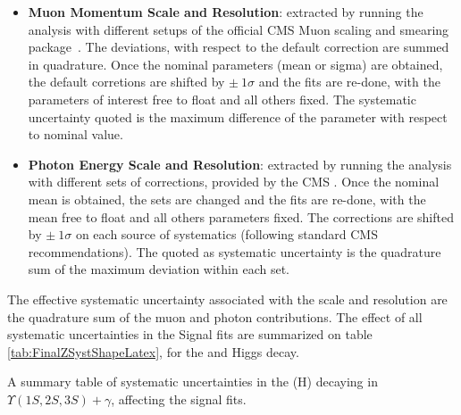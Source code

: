 \begin{itemize}

\item \textbf{Muon Momentum Scale and Resolution}: extracted by running the analysis with different setups of the official CMS Muon scaling and smearing package~. The deviations, with respect to the default correction are summed in quadrature. Once the nominal parameters (mean or sigma) are obtained, the default corretions are shifted by $\pm~1\sigma$ and the fits are re-done, with the parameters of interest free to float and all others fixed. The systematic uncertainty quoted is the maximum difference of the parameter with respect to nominal value.

\item \textbf{Photon Energy Scale and Resolution}: extracted by running the analysis with different sets of corrections, provided by the CMS . Once the nominal mean is obtained, the sets are changed and the fits are re-done, with the mean free to float and all others parameters fixed. The corrections are shifted by $\pm~1\sigma$ on each source of systematics (following standard CMS recommendations). The quoted as systematic uncertainty is the quadrature sum of the maximum deviation within each set.


\end{itemize}

The effective systematic uncertainty associated with the scale and resolution are the quadrature sum of the muon and photon contributions. The effect of all systematic uncertainties in the Signal fits are summarized on table \ref{tab:FinalZSystShapeLatex}, for the \Z and Higgs decay. 

\begin{table}[ht]
\begin{center}

\caption{A summary table of systematic uncertainties in the \Z(H) decaying in $ \Upsilon(1S,2S,3S) + \gamma$, affecting the signal fits.}
\label{tab:FinalZSystShapeLatex}
\end{center}
\end{table}

